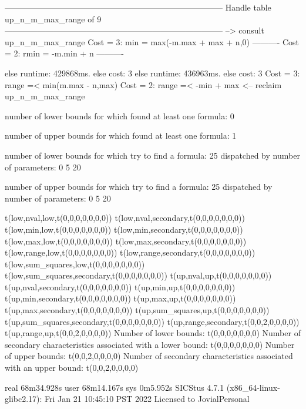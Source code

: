 --------------------------------------------------------------------------------
Handle table up_n_m_max_range of 9
--------------------------------------------------------------------------------
--> consult up_n_m_max_range
Cost =  3:  min  = max(-m.max + max + n,0)
----------
Cost =  2:  rmin = -m.min + n
----------

else runtime: 429868ms. else cost: 3
else runtime: 436963ms. else cost: 3
Cost =  3:  range =< min(m.max - n,max) %
Cost =  2:  range =< -min + max
<-- reclaim up_n_m_max_range

number of lower bounds for which found at least one formula: 0

number of upper bounds for which found at least one formula: 1

number of lower bounds for which try to find a formula: 25
dispatched by number of parameters: 0  5  20

number of upper bounds for which try to find a formula: 25
dispatched by number of parameters: 0  5  20

t(low,nval,low,t(0,0,0,0,0,0,0))
t(low,nval,secondary,t(0,0,0,0,0,0,0))
t(low,min,low,t(0,0,0,0,0,0,0))
t(low,min,secondary,t(0,0,0,0,0,0,0))
t(low,max,low,t(0,0,0,0,0,0,0))
t(low,max,secondary,t(0,0,0,0,0,0,0))
t(low,range,low,t(0,0,0,0,0,0,0))
t(low,range,secondary,t(0,0,0,0,0,0,0))
t(low,sum_squares,low,t(0,0,0,0,0,0,0))
t(low,sum_squares,secondary,t(0,0,0,0,0,0,0))
t(up,nval,up,t(0,0,0,0,0,0,0))
t(up,nval,secondary,t(0,0,0,0,0,0,0))
t(up,min,up,t(0,0,0,0,0,0,0))
t(up,min,secondary,t(0,0,0,0,0,0,0))
t(up,max,up,t(0,0,0,0,0,0,0))
t(up,max,secondary,t(0,0,0,0,0,0,0))
t(up,sum_squares,up,t(0,0,0,0,0,0,0))
t(up,sum_squares,secondary,t(0,0,0,0,0,0,0))
t(up,range,secondary,t(0,0,2,0,0,0,0))
t(up,range,up,t(0,0,2,0,0,0,0))
Number of lower bounds:                                             t(0,0,0,0,0,0,0)
Number of secondary characteristics associated with a lower bound:  t(0,0,0,0,0,0,0)
Number of upper bounds:                                             t(0,0,2,0,0,0,0)
Number of secondary characteristics associated with an upper bound: t(0,0,2,0,0,0,0)

real	68m34.928s
user	68m14.167s
sys	0m5.952s
SICStus 4.7.1 (x86_64-linux-glibc2.17): Fri Jan 21 10:45:10 PST 2022
Licensed to JovialPersonal



